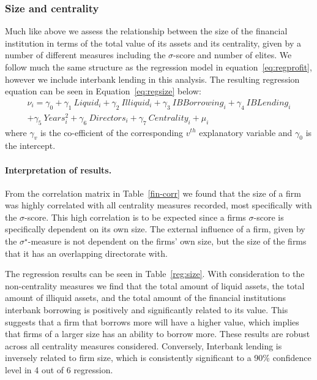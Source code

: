 \subsubsection*{Size and centrality}

Much like above we assess the relationship between the size of the financial institution in terms of the total value of its assets and its centrality, given by a number of different measures including the $\sigma$-score and number of elites. We follow much the same structure as the regression model in equation~\ref{eq:regprofit}, however we include interbank lending in this analysis. The resulting regression equation can be seen in Equation~\ref{eq:regsize} below:
\begin{multline} \label{eq:regsize}
\nu_{i} = \gamma_{0} + \gamma_{1}~Liquid_{i} + \gamma_{2}~Illiquid_{i} + \gamma_{3}~IBBorrowing_{i} + \gamma_{4}~IBLending_{i}\\
+ \gamma_{5}~Years^{2}_{i} + \gamma_{6}~Directors_{i} + \gamma_{7}~Centrality_{i} + \mu_{i}
\end{multline}
where $\gamma_{v}$ is the co-efficient of the corresponding $v^{th}$ explanatory variable and $\gamma_{0}$ is the intercept.

\paragraph{Interpretation of results.}

From the correlation matrix in Table~\ref{fin-corr} we found that the size of a firm was highly correlated with all centrality measures recorded, most specifically with the $\sigma$-score. This high correlation is to be expected since a firms $\sigma$-score is specifically dependent on its own size. The external influence of a firm, given by the $\sigma^{\star}$-measure is not dependent on the firms' own size, but the size of the firms that it has an overlapping directorate with.

The regression results can be seen in Table~\ref{reg:size}. With consideration to the non-centrality measures we find that the total amount of liquid assets, the total amount of illiquid assets, and the total amount of the financial institutions interbank borrowing is positively and significantly related to its value. This suggests that a firm that borrows more will have a higher value, which implies that firms of a larger size has an ability to borrow more. These results are robust across all centrality measures considered. Conversely, Interbank lending is inversely related to firm size, which is consistently significant to a 90\% confidence level in 4 out of 6 regression.

